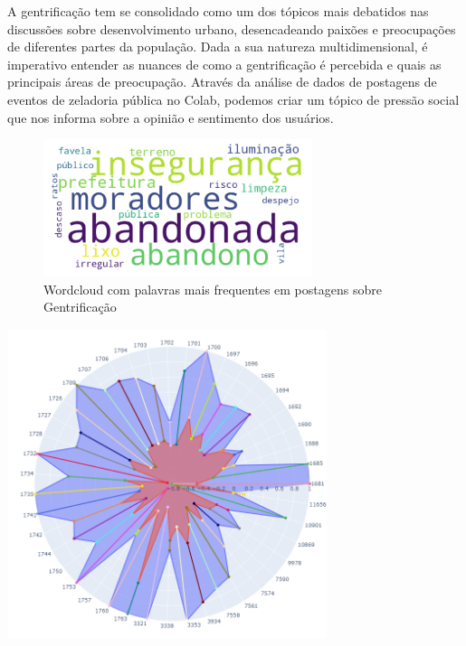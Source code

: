 A gentrificação tem se consolidado como um dos tópicos mais debatidos nas discussões sobre desenvolvimento urbano, desencadeando paixões e preocupações de diferentes partes da população. Dada a sua natureza multidimensional, é imperativo entender as nuances de como a gentrificação é percebida e quais as principais áreas de preocupação. Através da análise de dados de postagens de eventos de zeladoria pública no Colab, podemos criar um tópico de pressão social que nos informa sobre a opinião e sentimento dos usuários.

\begin{figure}[htb]
	\centering
	\includegraphics[width=0.7\textwidth]{images/wordcloud_gentrification.png}
	\caption{Wordcloud com palavras mais frequentes em postagens sobre Gentrificação}
	\label{fig:wordcloud_gentrification}
\end{figure}

\begin{quadro}[htb]
	\centering
	\includegraphics[width=0.7\textwidth]{images/social_barometer_gentrification.png}
	\caption{Gráfico de Radar ilustrando a pressão social em relação ao tópico de Gentrificação}
	\label{fig:social_barometer_gentrification}
\end{quadro}

